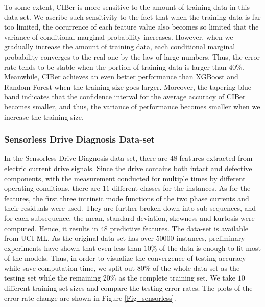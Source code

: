 \documentclass[twoside,11pt]{article}
\begin{document}
To some extent, CIBer is more sensitive to the amount of training data in this data-set. We ascribe such sensitivity to the fact that when the training data is far too limited, the occurrence of each feature value also becomes so limited that the variance of conditional marginal probability increases. However, when we gradually increase the amount of training data, each conditional marginal probability converges to the real one by the law of large numbers. Thus, the error rate tends to be stable when the portion of training data is larger than $40\%$. Meanwhile, CIBer achieves an even better performance than XGBoost and Random Forest when the training size goes larger. Moreover, the tapering blue band indicates that the confidence interval for the average accuracy of CIBer becomes smaller, and thus, the variance of performance becomes smaller when we increase the training size.

\subsubsection{Sensorless Drive Diagnosis Data-set}
In the Sensorless Drive Diagnosis data-set, there are $48$ features extracted from electric current drive signals. Since the drive contains both intact and defective components, with the measurement conducted for multiple times by different operating conditions, there are $11$ different classes for the instances. As for the features, the first three intrinsic mode functions of the two phase currents and their residuals were used. They are further broken down into sub-sequences, and for each subsequence, the mean, standard deviation, skewness and kurtosis were computed. Hence, it results in $48$ predictive features. The data-set is available from UCI ML. As the original data-set has over $50000$ instances, preliminary experiments have shown that even less than $10\%$ of the data is enough to fit most of the models. Thus, in order to visualize the convergence of testing accuracy while save computation time, we split out $80\%$ of the whole data-set as the testing set while the remaining $20\%$ as the complete training set. We take $10$ different training set sizes and compare the testing error rates. The plots of the error rate change are shown in Figure \ref{Fig_sensorless}.
\end{document}
